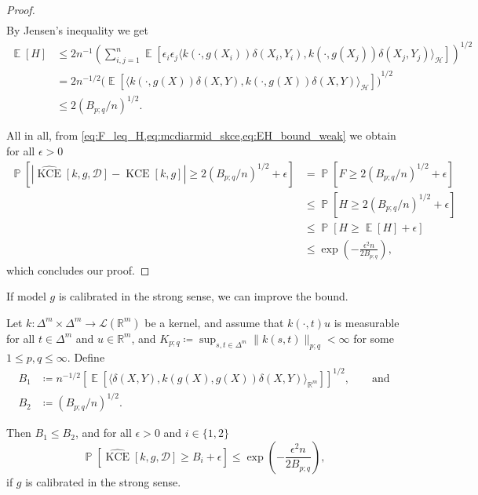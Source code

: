 \documentclass{article}
\DeclareMathOperator{\Prob}{\mathbb{P}}
\DeclareMathOperator{\Expect}{\mathbb{E}}
\DeclareMathOperator{\kernelmeasure}{KCE}
\begin{document}
\begin{proof}
\begin{equation*}
\begin{split}
    \end{split}
  \end{equation*}
  By Jensen's inequality we get
  \begin{equation}\label{eq:EH_bound_weak}
    \begin{split}
      \Expect[H] &\leq 2n^{-1} {\left(\sum_{i,j=1}^n \Expect\left[\epsilon_i \epsilon_j \langle k(\cdot, g(X_i)) \delta(X_i, Y_i), k(\cdot, g(X_j)) \delta(X_j, Y_j) \rangle_{\mathcal{H}} \right]\right)}^{1/2} \\
      &= 2n^{-1/2} {\Big(\Expect\left[\langle k(\cdot, g(X)) \delta(X, Y), k(\cdot, g(X)) \delta(X, Y) \rangle_{\mathcal{H}} \right]\Big)}^{1/2} \\
      &\leq 2{(B_{p;q}/n)}^{1/2}.
    \end{split}
  \end{equation}

  All in all, from \cref{eq:F_leq_H,eq:mcdiarmid_skce,eq:EH_bound_weak} we
  obtain for all $\epsilon > 0$
  \begin{equation*}
    \begin{split}
      \Prob\left[\left|\widehat{\kernelmeasure}[k, g, \mathcal{D}] - \kernelmeasure[k, g]\right| \geq 2{(B_{p;q} / n)}^{1/2} + \epsilon \right] &= \Prob[F \geq 2{(B_{p;q}/n)}^{1/2} + \epsilon] \\
      &\leq \Prob[H \geq 2{(B_{p;q}/n)}^{1/2} + \epsilon] \\
      &\leq \Prob[H \geq \Expect[H] + \epsilon] \\
      &\leq \exp{\left( - \frac{\epsilon^2n}{2B_{p;q}}\right)},
    \end{split}
  \end{equation*}
  which concludes our proof.
\end{proof}

If model $g$ is calibrated in the strong sense, we can improve the bound.

\begin{theorem}\label{thm:biased_bound_uniform}
  Let $k \colon \Delta^m \times \Delta^m \to \mathcal{L}(\mathbb{R}^m)$ be a
  kernel, and assume that $k(\cdot, t)u$ is measurable for all $t \in \Delta^m$
  and $u \in \mathbb{R}^m$, and
  $K_{p;q} \coloneqq \sup_{s,t \in \Delta^m} \|k(s,t)\|_{p;q} < \infty$ for some
  $1 \leq p,q \leq \infty$. Define
  \begin{align*}
    B_1 &\coloneqq n^{-1/2} \left[\Expect\left[\langle \delta(X, Y), k(g(X), g(X)) \delta(X,Y)\rangle_{\mathbb{R}^m}\right] \right]^{1/2}, \qquad \text{and}\\
    B_2 &\coloneqq {\left(B_{p;q} / n\right)}^{1/2}.
  \end{align*}

  Then $B_1 \leq B_2$, and for all $\epsilon > 0$ and $i \in \{1,2\}$
  \begin{equation*}
    \Prob\left[\widehat{\kernelmeasure}[k, g, \mathcal{D}] \geq B_i + \epsilon\right] \leq  \exp{\left(- \frac{\epsilon^2 n}{2 B_{p;q}}\right)},
  \end{equation*}
  if $g$ is calibrated in the strong sense.
\end{theorem}
\end{document}
